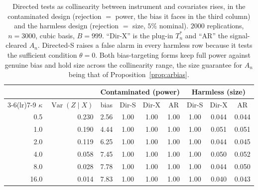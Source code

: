 \documentclass[preprint,11pt,authoryear]{elsarticle}
\theoremstyle{definition}
\newcommand{\Var}{\operatorname{Var}}
\begin{document}
\begin{table}[h]\centering
\caption{Directed tests as collinearity between instrument and covariates rises, in the
contaminated design (rejection $=$ power, the bias it faces in the third column) and
the harmless design (rejection $=$ size, $5\%$ nominal). $\num{2000}$ replications,
$n=3000$, cubic basis, $B=999$. ``Dir-X'' is the plug-in $T_n^{\ast}$ and ``AR'' the
signal-cleared $A_n$. Directed-S raises a false alarm in every harmless row because it tests
the sufficient condition $\theta=0$. Both bias-targeting forms keep full power against
genuine bias and hold size across the collinearity range, the size guarantee for $A_n$
being that of Proposition~\ref{prop:arbias}.}
\label{tab:svx}
\begin{tabular}{rrccccccc}
\toprule
 & & \multicolumn{4}{c}{Contaminated (power)} & \multicolumn{3}{c}{Harmless (size)}\\
\cmidrule(lr){3-6}\cmidrule(lr){7-9}
$\kappa$ & $\Var(Z\mid X)$ & bias & Dir-S & Dir-X & AR & Dir-S & Dir-X & AR\\
\midrule
0.5  & 0.230 & 2.56 & 1.00 & 1.00 & 1.00 & 1.00 & 0.044 & 0.044\\
1.0  & 0.190 & 4.44 & 1.00 & 1.00 & 1.00 & 1.00 & 0.051 & 0.051\\
2.0  & 0.119 & 6.25 & 1.00 & 1.00 & 1.00 & 1.00 & 0.044 & 0.045\\
4.0  & 0.058 & 7.45 & 1.00 & 1.00 & 1.00 & 1.00 & 0.050 & 0.052\\
8.0  & 0.028 & 7.78 & 1.00 & 1.00 & 1.00 & 1.00 & 0.044 & 0.050\\
16.0 & 0.014 & 7.83 & 1.00 & 1.00 & 1.00 & 1.00 & 0.040 & 0.043\\
\bottomrule
\end{tabular}
\end{table}
\end{document}
